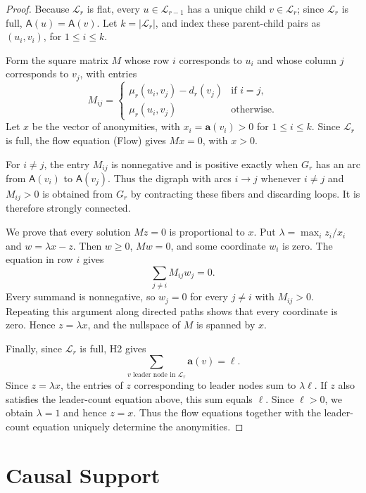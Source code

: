 \documentclass[11pt]{article}
\newcommand{\anon}{\mathbf a}
\newcommand{\agents}{\mathsf A}
\begin{document}
\begin{proof}
Because \(\mathcal L_r\) is flat, every \(u\in\mathcal L_{r-1}\)
has a unique child \(v\in\mathcal L_r\); since \(\mathcal L_r\) is full,
\(\agents(u)=\agents(v)\).
Let \(k=|\mathcal L_r|\), and index these parent-child pairs as
\((u_i,v_i)\), for \(1\leq i\leq k\).

Form the square matrix \(M\) whose row \(i\) corresponds to \(u_i\)
and whose column \(j\) corresponds to \(v_j\), with entries
\[
 M_{ij}=
 \begin{cases}
  \mu_r(u_i,v_j)-d_r(v_j)&\text{if \(i=j\)},\\
  \mu_r(u_i,v_j)&\text{otherwise}.
 \end{cases}
\]
Let \(x\) be the vector of anonymities, with
\(x_i=\anon(v_i)>0\) for \(1\leq i\leq k\).
Since \(\mathcal L_r\) is full, the flow equation
\textup{(Flow)} gives \(Mx=0\), with \(x>0\).

For \(i\ne j\), the entry \(M_{ij}\) is nonnegative and is positive
exactly when \(G_r\) has an arc from \(\agents(v_i)\) to
\(\agents(v_j)\). Thus the digraph with arcs \(i\to j\) whenever
\(i\ne j\) and \(M_{ij}>0\) is obtained from \(G_r\) by contracting
these fibers and discarding loops. It is therefore strongly connected.

We prove that every solution \(Mz=0\) is proportional to \(x\).
Put \(\lambda=\max_i z_i/x_i\) and \(w=\lambda x-z\).
Then \(w\geq0\), \(Mw=0\), and some coordinate \(w_i\) is zero.
The equation in row \(i\) gives
\[
 \sum_{j\ne i}M_{ij}w_j=0.
\]
Every summand is nonnegative, so \(w_j=0\) for every \(j\ne i\)
with \(M_{ij}>0\).
Repeating this argument along directed paths shows that every
coordinate is zero. Hence \(z=\lambda x\), and the nullspace of
\(M\) is spanned by \(x\).

Finally, since \(\mathcal L_r\) is full, H2 gives
\[
 \sum_{v\text{ leader node in }\mathcal L_r}\anon(v)=\ell.
\]
Since \(z=\lambda x\), the entries of \(z\) corresponding to leader
nodes sum to \(\lambda\ell\). If \(z\) also satisfies the leader-count
equation above, this sum equals \(\ell\). Since \(\ell>0\), we obtain
\(\lambda=1\) and hence \(z=x\). Thus the flow equations together
with the leader-count equation uniquely determine the anonymities.
\end{proof}

\section{Causal Support}
\label{app:causal-support}
\end{document}
